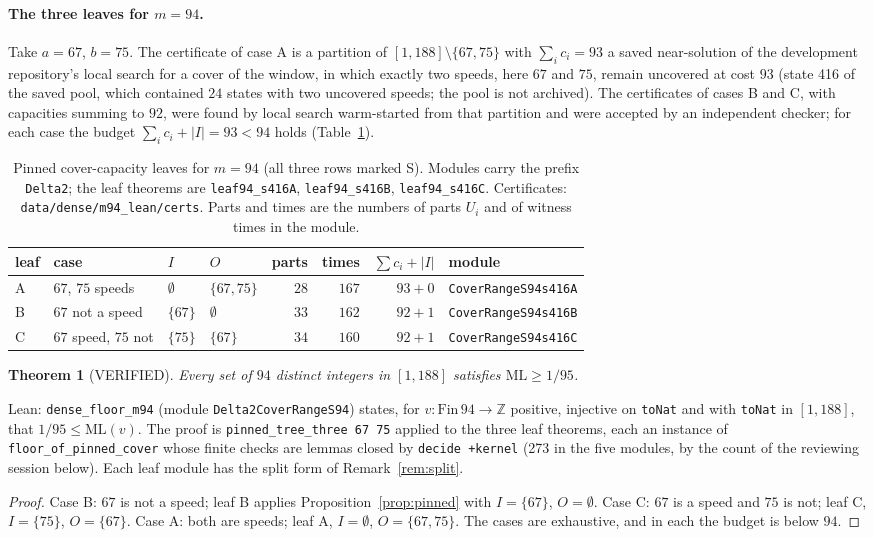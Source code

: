 \documentclass[11pt]{article}
\newtheorem{theorem}{Theorem}
\theoremstyle{remark}
\newcommand{\ML}{\mathrm{ML}}
\newcommand{\Z}{\mathbb{Z}}
\begin{document}
\paragraph{The three leaves for $m=94$.} Take $a=67$, $b=75$. The certificate of case A is a partition of $[1,188]\setminus\{67,75\}$ with $\sum_ic_i=93$ a saved near-solution of the development repository's local search for a cover of the window, in which exactly two speeds, here $67$ and $75$, remain uncovered at cost $93$ (state 416 of the saved pool, which contained $24$ states with two uncovered speeds; the pool is not archived). The certificates of cases B and C, with capacities summing to $92$, were found by local search warm-started from that partition and were accepted by an independent checker; for each case the budget $\sum_ic_i+|I|=93<94$ holds (Table~\ref{tab:m94}).
\begin{table}[ht]
\centering
\begin{tabular}{llllrrrl}
\toprule
leaf & case & $I$ & $O$ & parts & times & $\sum c_i+|I|$ & module\\
\midrule
A & $67$, $75$ speeds & $\emptyset$ & $\{67,75\}$ & $28$ & $167$ & $93+0$ & \texttt{CoverRangeS94s416A}\\
B & $67$ not a speed & $\{67\}$ & $\emptyset$ & $33$ & $162$ & $92+1$ & \texttt{CoverRangeS94s416B}\\
C & $67$ speed, $75$ not & $\{75\}$ & $\{67\}$ & $34$ & $160$ & $92+1$ & \texttt{CoverRangeS94s416C}\\
\bottomrule
\end{tabular}
\caption{Pinned cover-capacity leaves for $m=94$ (all three rows marked S). Modules carry the prefix \texttt{Delta2}; the leaf theorems are \texttt{leaf94\_s416A}, \texttt{leaf94\_s416B}, \texttt{leaf94\_s416C}. Certificates: \texttt{data/dense/m94\_lean/certs}. Parts and times are the numbers of parts $U_i$ and of witness times in the module.}\label{tab:m94}
\end{table}

\begin{theorem}[VERIFIED]\label{thm:m94}
Every set of $94$ distinct integers in $[1,188]$ satisfies $\ML\ge1/95$.
\end{theorem}
\noindent Lean: \texttt{dense\_floor\_m94} (module \texttt{Delta2CoverRangeS94}) states, for $v:\mathrm{Fin}\,94\to\Z$ positive, injective on \texttt{toNat} and with \texttt{toNat} in $[1,188]$, that $1/95\le\ML(v)$. The proof is \texttt{pinned\_tree\_three 67 75} applied to the three leaf theorems, each an instance of \texttt{floor\_of\_pinned\_cover} whose finite checks are lemmas closed by \texttt{decide +kernel} (273 in the five modules, by the count of the reviewing session below). Each leaf module has the split form of Remark~\ref{rem:split}.
\begin{proof}
Case B: $67$ is not a speed; leaf B applies Proposition~\ref{prop:pinned} with $I=\{67\}$, $O=\emptyset$. Case C: $67$ is a speed and $75$ is not; leaf C, $I=\{75\}$, $O=\{67\}$. Case A: both are speeds; leaf A, $I=\emptyset$, $O=\{67,75\}$. The cases are exhaustive, and in each the budget is below $94$.
\end{proof}
\end{document}
